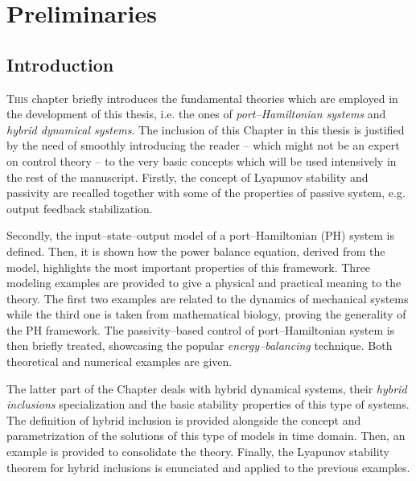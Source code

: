 
\chapter{Preliminaries}
\label{chap:preliminaries}
\minitoc

\thispagestyle{empty}

\newpage
{}
%
\section{Introduction\label{sec:2_intro}}
\lettrine[lines=4]{\color{brickred}T}{his} chapter briefly introduces the fundamental theories which are employed in the development of this thesis, i.e. the ones of \textit{port--Hamiltonian systems} and \textit{hybrid dynamical systems}. The inclusion of this Chapter in this thesis is justified by the need of smoothly introducing the reader -- which might not be an expert on control theory -- to the very basic concepts which will be used intensively in the rest of the manuscript.
Firstly, the concept of Lyapunov stability and passivity are recalled together with some of the properties of passive system, e.g. output feedback stabilization.
%
\newline

%
Secondly, the input--state--output model of a port--Hamiltonian (PH) system is defined. Then, it is shown how the power balance equation, derived from the model, highlights the most important properties of this framework. Three modeling examples are provided to give a physical and practical meaning to the theory. The first two examples are related to the dynamics of mechanical systems while the third one is taken from mathematical biology, proving the generality of the PH framework.   
The passivity--based control of port--Hamiltonian system is then briefly treated, showcasing the popular \textit{energy--balancing} technique. Both theoretical and numerical examples are given. 
%
\newline

%
The latter part of the Chapter deals with hybrid dynamical systems, their \textit{hybrid inclusions} specialization and the basic stability properties of this type of systems. The definition of hybrid inclusion is provided alongside the concept and parametrization of the solutions of this type of models in time domain. Then, an example is provided to consolidate the theory. Finally, the Lyapunov stability theorem for hybrid inclusions is enunciated and applied to the previous examples. 
%

